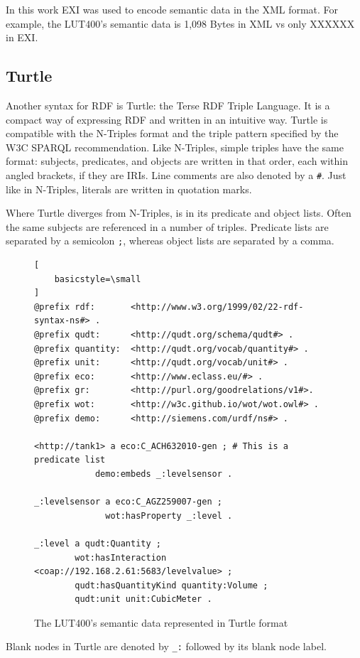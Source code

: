 In this work EXI was used to encode semantic data in the XML format. For example, the LUT400's semantic data is 1,098 Bytes in XML vs only XXXXXX in EXI.


\subsection{Turtle}
Another syntax for RDF is Turtle: the Terse RDF Triple Language. It is a compact way of expressing RDF and written in an intuitive way. Turtle is compatible with the N-Triples format and the triple pattern specified by the W3C SPARQL recommendation.
Like N-Triples, simple triples have the same format: subjects, predicates, and objects are written in that order, each within angled brackets, if they are IRIs. Line comments are also denoted by a \texttt{\#}. Just like in N-Triples, literals are written in quotation marks.

Where Turtle diverges from N-Triples, is in its predicate and object lists. Often the same subjects are referenced in a number of triples. Predicate lists are separated by a semicolon \texttt{;}, whereas object lists are separated by a comma.

\begin{figure}[th]
	\centering
	\begin{lstlisting}[
    basicstyle=\small
]
@prefix rdf:       <http://www.w3.org/1999/02/22-rdf-syntax-ns#> .
@prefix qudt:      <http://qudt.org/schema/qudt#> .
@prefix quantity:  <http://qudt.org/vocab/quantity#> .
@prefix unit:      <http://qudt.org/vocab/unit#> .
@prefix eco:       <http://www.eclass.eu/#> .
@prefix gr:        <http://purl.org/goodrelations/v1#>.
@prefix wot:       <http://w3c.github.io/wot/wot.owl#> .
@prefix demo:      <http://siemens.com/urdf/ns#> .

<http://tank1> a eco:C_ACH632010-gen ; # This is a predicate list
            demo:embeds _:levelsensor .

_:levelsensor a eco:C_AGZ259007-gen ;
              wot:hasProperty _:level .

_:level a qudt:Quantity ;
        wot:hasInteraction <coap://192.168.2.61:5683/levelvalue> ;
        qudt:hasQuantityKind quantity:Volume ;
        qudt:unit unit:CubicMeter .
	\end{lstlisting}
    \caption{The LUT400's semantic data represented in Turtle format}
\end{figure}

Blank nodes in Turtle are denoted by \texttt{\_:} followed by its blank node label.

